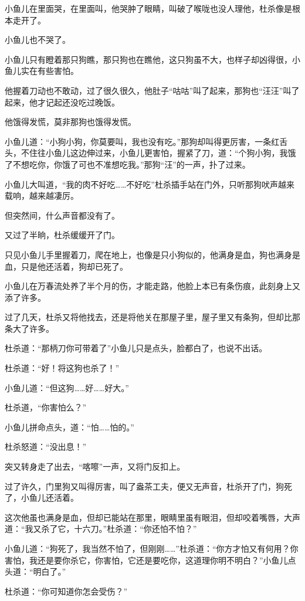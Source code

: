 \documentclass[12pt,oneside]{book}
\begin{document}
小鱼儿在里面哭，在里面叫，他哭肿了眼睛，叫破了喉咙也没人理他，杜杀像是根本走开了。

小鱼儿也不哭了。

小鱼儿只有瞪着那只狗瞧，那只狗也在瞧他，这只狗虽不大，也样子却凶得很，小鱼儿实在有些害怕。

他握着刀动也不敢动，过了很久很久，他肚子``咕咕''叫了起来，那狗也``汪汪''叫了起来，他才记起还没吃过晚饭。

他饿得发慌，莫非那狗也饿得发慌。

小鱼儿道：``小狗小狗，你莫要叫，我也没有吃。''那狗却叫得更厉害，一条红舌头，不住往小鱼儿这边伸过来，小鱼儿更害怕，握紧了刀，道：``个狗小狗，我饿了不想吃你，你饿了可也不准想吃我。''那狗``汪''的一声，扑了过来。

小鱼儿大叫道，``我的肉不好吃\ldots\ldots 不好吃''杜杀插手站在门外，只听那狗吠声越来载响，越来越凄厉。

但突然间，什么声音都没有了。

又过了半晌，杜杀缓缓开了门。

只见小鱼儿手里握着刀，爬在地上，也像是只小狗似的，他满身是血，狗也满身是血，只是他还活着，狗却已死了。

小鱼儿在万春流处养了半个月的伤，才能走路，他脸上本已有条伤痕，此刻身上又添了许多。

过了几天，杜杀又将他找去，还是将他关在那屋子里，屋子里又有条狗，但却比那条大了许多。

杜杀道：``那柄刀你可带着了''小鱼儿只是点头，脸都白了，也说不出话。

杜杀道：``好！将这狗也杀了！''

小鱼儿道：``但这狗\ldots\ldots 好\ldots\ldots 好大。''

杜杀道，``你害怕么？''

小鱼儿拼命点头，道：``怕\ldots\ldots 怕的。''

杜杀怒道：``没出息！''

突又转身走了出去，``喀嚓''一声，又将门反扣上。

过了许久，门里狗又叫得厉害，叫了盎茶工夫，便又无声音，杜杀开了门，狗死了，小鱼儿还活着。

这次他虽也满身是血，但却已能站在那里，眼睛里虽有眼泪，但却咬着嘴唇，大声道：``我又杀了它，十六刀。''杜杀道：``你还怕不怕？''

小鱼儿道：``狗死了，我当然不怕了，但刚刚\ldots\ldots{}''杜杀道：``你方才怕又有何用？你害怕，我还是要你杀它，你害怕，它还是要吃你，这道理你明不明白？''小鱼儿点头道：``明白了。''

杜杀道：``你可知道你怎会受伤？''
\end{document}
